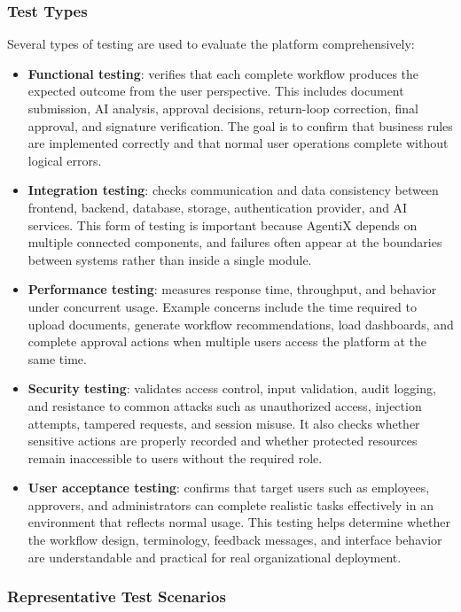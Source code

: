 \documentclass[12pt,oneside,openright,a4paper]{cpe-english-project}
\begin{document}
\subsubsection{Test Types}

Several types of testing are used to evaluate the platform comprehensively:

\begin{itemize}
  \item \textbf{Functional testing}: verifies that each complete workflow produces the expected outcome from the user perspective. This includes document submission, AI analysis, approval decisions, return-loop correction, final approval, and signature verification. The goal is to confirm that business rules are implemented correctly and that normal user operations complete without logical errors.
  \item \textbf{Integration testing}: checks communication and data consistency between frontend, backend, database, storage, authentication provider, and AI services. This form of testing is important because AgentiX depends on multiple connected components, and failures often appear at the boundaries between systems rather than inside a single module.
  \item \textbf{Performance testing}: measures response time, throughput, and behavior under concurrent usage. Example concerns include the time required to upload documents, generate workflow recommendations, load dashboards, and complete approval actions when multiple users access the platform at the same time.
  \item \textbf{Security testing}: validates access control, input validation, audit logging, and resistance to common attacks such as unauthorized access, injection attempts, tampered requests, and session misuse. It also checks whether sensitive actions are properly recorded and whether protected resources remain inaccessible to users without the required role.
  \item \textbf{User acceptance testing}: confirms that target users such as employees, approvers, and administrators can complete realistic tasks effectively in an environment that reflects normal usage. This testing helps determine whether the workflow design, terminology, feedback messages, and interface behavior are understandable and practical for real organizational deployment.
\end{itemize}

\subsubsection{Representative Test Scenarios}
\end{document}
